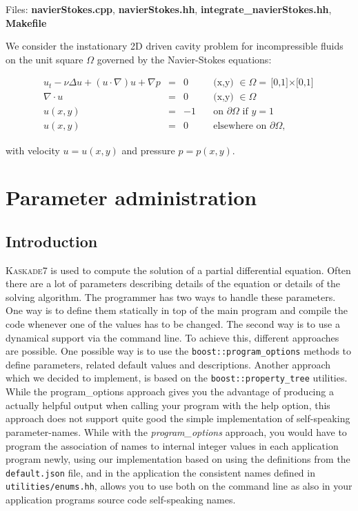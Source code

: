 \documentclass[11pt]{article}
\newcommand{\K}{\textsc{Kaskade7 }}
\begin{document}
\noindent Files: {\bf navierStokes.cpp}, {\bf navierStokes.hh}, {\bf integrate\_navierStokes.hh}, {\bf Makefile}

\noindent We consider the instationary 2D driven cavity problem for incompressible fluids
on the unit square $\Omega$ governed by the   Navier-Stokes equations: 


\begin{equation}\label{PDE_navierStokes}
\begin{array}{rcll}
u_t  - \nu \Delta u + (u \cdot \nabla)u + \nabla p &=& 0 &\quad \mbox{(x,y) }\in  \Omega = \mbox{[0,1]$\times$[0,1]}\\[2mm]
 \nabla  \cdot u &=& 0 &\quad \mbox{(x,y) }\in  \Omega\\[2mm]
u(x,y) &=&-1 &\quad \mbox{on } \partial \Omega \mbox{ if }  y = 1\\[2mm]
u(x,y) &=& 0 &\quad \mbox{elsewhere on } \partial \Omega ,
\end{array}
\end{equation}

\noindent with velocity $u = u(x,y)$ and pressure $p = p(x,y)$.



\section{Parameter administration}\label{ParaAdmin}

\subsection{Introduction}
\K is used to compute the solution of a partial differential equation. Often
there are a lot of parameters describing details of the equation or details of
the solving algorithm.
The programmer has two ways to handle these parameters. One way is to define 
them statically in
top of the main program and compile the code whenever one of the 
values has to be changed.
The second way is to use a dynamical support via the command line. To achieve
this, different approaches are possible. One possible way is to use the {\tt boost::program\_options} methods to define parameters, related default values and
descriptions. Another approach which we decided to implement, is based on the
{\tt boost::property\_tree} utilities. While the program\_options approach gives you the
advantage of producing a actually helpful output when calling your program with
the help option, this approach does not support quite good the simple
implementation of self-speaking parameter-names. While with the {\em program\_options}
approach, you would have to program the association of names to internal integer
values in each application program newly, using our implementation based on
using the definitions from the {\tt default.json} file, and in the application
the consistent names defined in {\tt utilities/enums.hh}, allows you to use both on the command line  as also in your application programs source code self-speaking names.
\end{document}
